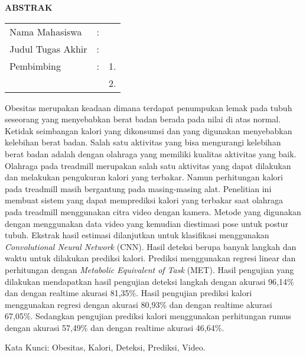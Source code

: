 \begin{center}
  \large\textbf{ABSTRAK}
\end{center}


\vspace{2ex}

\begingroup
\setlength{\tabcolsep}{0pt}

\noindent
\begin{tabularx}{\textwidth}{l >{\centering}m{2em} X}
  Nama Mahasiswa    & : & \name{}         \\

  Judul Tugas Akhir & : & \tatitle{}      \\

  Pembimbing        & : & 1. \advisor{}   \\
                    &   & 2. \coadvisor{} \\
\end{tabularx}
\endgroup

Obesitas merupakan keadaan dimana terdapat penumpukan lemak pada tubuh seseorang yang menyebabkan berat badan berada pada nilai di atas normal. Ketidak seimbangan kalori yang dikonsumsi dan yang digunakan menyebabkan kelebihan berat badan. Salah satu aktivitas yang bisa mengurangi kelebihan berat badan adalah dengan olahraga yang memiliki kualitas aktivitas yang baik. Olahraga pada treadmill merupakan salah satu aktivitas yang dapat dilakukan dan melakukan pengukuran kalori yang terbakar. Namun perhitungan kalori pada treadmill masih bergantung pada masing-masing alat. Penelitian ini membuat sistem yang dapat memprediksi kalori yang terbakar saat olahraga pada treadmill menggunakan citra video dengan kamera. Metode yang digunakan dengan menggunakan data video yang kemudian diestimasi pose untuk postur tubuh. Ekstrak hasil estimasi dilanjutkan untuk klasifikasi menggunakan \emph{Convolutional Neural Network} (CNN). Hasil deteksi berupa banyak langkah dan waktu untuk dilakukan prediksi kalori. Prediksi menggunakan regresi linear dan perhitungan dengan \emph{Metabolic Equivalent of Task} (MET). Hasil pengujian yang dilakukan mendapatkan hasil pengujian deteksi langkah dengan akurasi 96,14\% dan dengan realtime akurasi 81,35\%. Hasil pengujian prediksi kalori menggunakan regresi dengan akurasi 80,93\% dan dengan realtime akurasi 67,05\%. Sedangkan pengujian prediksi kalori menggunakan perhitungan rumus dengan akurasi 57,49\% dan dengan realtime akurasi 46,64\%.

Kata Kunci: Obesitas, Kalori, Deteksi, Prediksi, Video.
